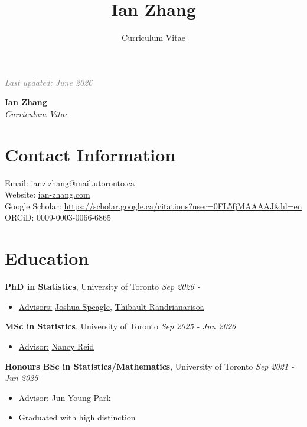 \documentclass[11pt]{article}
\title{Ian Zhang}
\author{Curriculum Vitae}
\theoremstyle{definition}
\newcommand{\1}{\mathds 1}
\begin{document}
\sloppy
\hfill {\scriptsize\textit{\textcolor{gray}{Last updated: June 2026}}}
\begin{center}
    {\huge \textbf{Ian Zhang}}\\
    \textit{Curriculum Vitae}
\end{center}

\section*{Contact Information}
Email: \href{mailto:ianz.zhang@mail.utoronto.ca}{ianz.zhang@mail.utoronto.ca}\\
Website: \href{www.ian-zhang.com}{ian-zhang.com}\\
Google Scholar: \url{https://scholar.google.ca/citations?user=0FL5fjMAAAAJ&hl=en}\\
ORCiD: 0009-0003-0066-6865

\section*{Education}
\textbf{PhD in Statistics}, University of Toronto \hfill \textit{Sep 2026 -}
\begin{itemize}[itemsep=2pt, parsep=0pt, topsep=0pt]
    \item \underline{Advisors:} \href{https://joshspeagle.com/}{Joshua Speagle}, \href{https://thibaultrandrianarisoa.netlify.app/}{Thibault Randrianarisoa}
\end{itemize}
\vspace{0.5em}
\textbf{MSc in Statistics}, University of Toronto \hfill \textit{Sep 2025 - Jun 2026}
\begin{itemize}[itemsep=2pt, parsep=0pt, topsep=0pt]
    \item \underline{Advisor:} \href{https://en.wikipedia.org/wiki/Nancy_Reid}{Nancy Reid}
\end{itemize}
\vspace{0.5em}
\textbf{Honours BSc in Statistics/Mathematics}, University of Toronto \hfill \textit{Sep 2021 - Jun 2025}
\begin{itemize}[itemsep=2pt, parsep=0pt, topsep=0pt]
    \item \underline{Advisor:} \href{https://junjypark.github.io/}{Jun Young Park}
    \item Graduated with high distinction
  \end{itemize}
  
\end{document}
